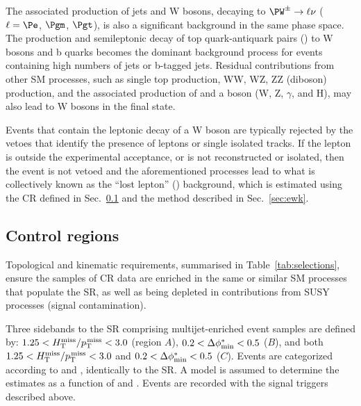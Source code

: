 The associated production of jets and W bosons, decaying to $\PW^\pm
\to \ell\nu$ ($\ell=\Pe$, $\Pgm$, $\Pgt$), is also a significant
background in the same phase space. The production and semileptonic
decay of top quark-antiquark pairs (\ttbar) to W bosons and b quarks
becomes the dominant background process for events containing high
numbers of jets or b-tagged jets. Residual contributions from other SM
processes, such as single top production, WW, WZ, ZZ (diboson)
production, and the associated production of \ttbar and a boson
({\ttbar}W, {\ttbar}Z, {\ttbar}$\gamma$, and {\ttbar}H), may also lead
to W bosons in the final state.

Events that contain the leptonic decay of a W boson are typically
rejected by the vetoes that identify the presence of leptons or single
isolated tracks. If the lepton is outside the experimental acceptance,
or is not reconstructed or isolated, then the event is not vetoed and
the aforementioned processes lead to what is collectively known as the
``lost lepton'' (\lost) background, which is estimated using the \mj
CR defined in Sec.~\ref{sec:control} and the method described in
Sec.~\ref{sec:ewk}.


\subsection{Control regions}
\label{sec:control}

Topological and kinematic requirements, summarised in
Table~\ref{tab:selections}, ensure the samples of CR data are enriched
in the same or similar SM processes that populate the SR, as well as
being depleted in contributions from SUSY processes (signal
contamination).

Three sidebands to the SR comprising multijet-enriched event samples
are defined by: $1.25 < H_{\text{T}}^{\text{miss}} / p_{\text{T}}^{\kern1pt\text{miss}} < 3.0$ (region $A$), $0.2 < \Delta\phi^{*}_\text{min} <
0.5$ ($B$), and both $1.25 < H_{\text{T}}^{\text{miss}} / p_{\text{T}}^{\kern1pt\text{miss}} < 3.0$ and $0.2 < \Delta\phi^{*}_\text{min} < 0.5$
($C$). Events are categorized according to \njet and \scalht,
identically to the SR. A model is assumed to determine the estimates
as a function of \nb and \mht. Events are recorded with the signal
triggers described above.

